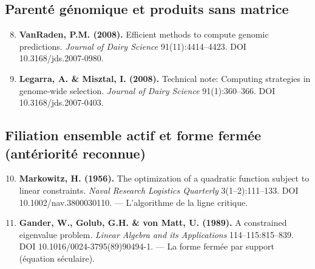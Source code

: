 \documentclass[11pt]{article}
\begin{document}
\subsection*{Parenté génomique et produits sans matrice}
\begin{enumerate}\setcounter{enumi}{7}
\item \textbf{VanRaden, P.M. (2008).} Efficient methods to compute genomic predictions. \emph{Journal of Dairy Science} 91(11):4414--4423. DOI 10.3168/jds.2007-0980.
\item \textbf{Legarra, A. \& Misztal, I. (2008).} Technical note: Computing strategies in genome-wide selection. \emph{Journal of Dairy Science} 91(1):360--366. DOI 10.3168/jds.2007-0403.
\end{enumerate}

\subsection*{Filiation ensemble actif et forme fermée (antériorité reconnue)}
\begin{enumerate}\setcounter{enumi}{9}
\item \textbf{Markowitz, H. (1956).} The optimization of a quadratic function subject to linear constraints. \emph{Naval Research Logistics Quarterly} 3(1--2):111--133. DOI 10.1002/nav.3800030110. --- L'algorithme de la ligne critique.
\item \textbf{Gander, W., Golub, G.H. \& von Matt, U. (1989).} A constrained eigenvalue problem. \emph{Linear Algebra and its Applications} 114--115:815--839. DOI 10.1016/0024-3795(89)90494-1. --- La forme fermée par support (équation séculaire).
\end{enumerate}
\end{document}
